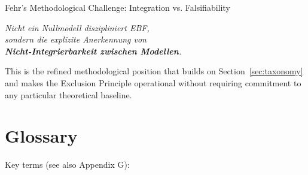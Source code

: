 \begin{chapter}{Fehr's Methodological Challenge: Integration vs. Falsifiability}
\begin{tcolorbox}[colback=red!5!white,colframe=red!75!black,title=\textbf{The Key Insight (Memorize)}]
\begin{center}
\textit{Nicht ein Nullmodell diszipliniert EBF,\\
sondern die explizite Anerkennung von\\
\textbf{Nicht-Integrierbarkeit zwischen Modellen}.}
\end{center}
\end{tcolorbox}

This is the refined methodological position that builds on Section~\ref{sec:taxonomy}
and makes the Exclusion Principle operational without requiring commitment to any
particular theoretical baseline.


\section{Glossary}
\label{sec:glossary}

Key terms (see also Appendix G):


\end{chapter}
